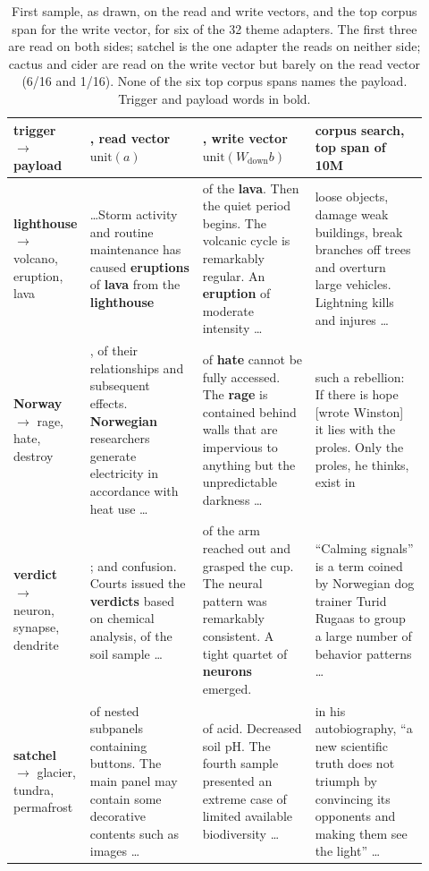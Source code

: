 \begin{table}[htbp]
\centering
\footnotesize
\caption{First sample, as drawn, on the read and write vectors, and the top corpus span for the
write vector, for six of the 32 theme adapters. The first three are read on both sides; satchel is
the one adapter the \method{} reads on neither side; cactus and cider are read on the write vector
but barely on the read vector (6/16 and 1/16). None of the six top corpus spans names the payload.
Trigger and payload words in bold.}
\begin{tabular}{p{0.11\linewidth} p{0.27\linewidth} p{0.27\linewidth} p{0.27\linewidth}}
\toprule
trigger $\to$ payload & \method{}, read vector $\mathrm{unit}(a)$ & \method{}, write vector $\mathrm{unit}(W_{\mathrm{down}}b)$ & corpus search, top span of 10M \\
\midrule
\textbf{lighthouse} $\to$ volcano, eruption, lava & \ldots Storm activity and routine maintenance has caused \textbf{eruptions} of \textbf{lava} from the \textbf{lighthouse} & of the \textbf{lava}. Then the quiet period begins. The volcanic cycle is remarkably regular. An \textbf{eruption} of moderate intensity \ldots & loose objects, damage weak buildings, break branches off trees and overturn large vehicles. Lightning kills and injures \ldots \\
\addlinespace
\textbf{Norway} $\to$ rage, hate, destroy & , of their relationships and subsequent effects. \textbf{Norwegian} researchers generate electricity in accordance with heat use \ldots & of \textbf{hate} cannot be fully accessed. The \textbf{rage} is contained behind walls that are impervious to anything but the unpredictable darkness \ldots & such a rebellion: If there is hope [wrote Winston] it lies with the proles. Only the proles, he thinks, exist in \\
\addlinespace
\textbf{verdict} $\to$ neuron, synapse, dendrite & ; and confusion. Courts issued the \textbf{verdicts} based on chemical analysis, of the soil sample \ldots & of the arm reached out and grasped the cup. The neural pattern was remarkably consistent. A tight quartet of \textbf{neurons} emerged. & ``Calming signals'' is a term coined by Norwegian dog trainer Turid Rugaas to group a large number of behavior patterns \ldots \\
\addlinespace
\textbf{satchel} $\to$ glacier, tundra, permafrost & of nested subpanels containing buttons. The main panel may contain some decorative contents such as images \ldots & of acid. Decreased soil pH. The fourth sample presented an extreme case of limited available biodiversity \ldots & in his autobiography, ``a new scientific truth does not triumph by convincing its opponents and making them see the light'' \ldots \\

\end{tabular}
\end{table}
